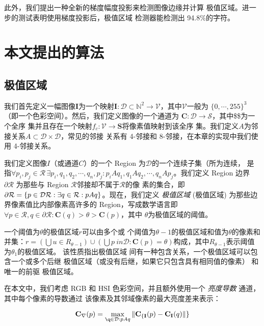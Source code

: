 \documentclass[UTF8]{ctexart}
\begin{document}
此外，我们提出一种全新的梯度幅度投影来检测图像边缘并计算 极值区域。进一步的测试表明使用梯度投影后，极值区域 检测器能检测出 94.8\%的字符。

\section{本文提出的算法}

\subsection{极值区域}

我们首先定义一幅图像$\mathbf{I}$为一个映射$\mathbf{I} : \mathcal{D} \subset
\mathbb{N}^2 \rightarrow \mathcal{V}$，其中$\mathcal{V}$一般为
$\{0,\cdots,255\}^3$（即一个色彩空间）。然后，我们定义图像的一个通道为
$\mathbf{C} : \mathcal{D} \rightarrow \mathcal{S}$，其中\$\$为一个全序
集并且存在一个映射$f_c : \mathcal{V} \rightarrow \mathbf{S}$将像素值映射到该全序
集。我们定义$A$为邻接关系$A \subset \mathcal{D} \times \mathcal{D}$，常见的邻接
关系有 4-邻接和 8-邻接，在本章的实现中我们使用 4-邻接关系。

我们定义图像$I$（或通道$C$）的一个 Region 为$\mathcal{D}$的一个连续子集（所为连续，
是指$\forall{p_i, p_j \in \mathcal{R}}\, \exists{p_i, q_1, q_2, \cdots, q_n,
  p_j} : p_iAq_1, q_1Aq_2,\cdots,q_nAp_j$。我们定义 Region 边界
$\partial{\mathcal{R}}$ 为那些与 Region $\mathcal{R}$邻接却不属于$\mathcal{R}$的像
素的集合，即$\partial{\mathcal{R}} = \{p \in \mathcal{D} \\ \mathcal{R} :
\exists{q \in \mathcal{R}} : pAq \}$。现在，我们定义 \textit{极值区域} (极值区域)
为那些边界像素值比内部像素高许多的 Region，写成数学语言即$ \forall{p \in
  \mathcal{R}}, q \in \partial{\mathcal{R}} : \mathbf{C}(q) > \theta > \mathbf{C}(p)$，其中
$\theta$为极值区域的阈值。

一个阈值为$\theta$的极值区域$r$可以由多个或
个阈值为$\theta - 1$的极值区域和值为$\theta$的像素和并集：$r = \left( \bigcup{u \in
    R_{\theta-1}} \right) \cup \left( \bigcup{p \ in \mathcal{D} : \mathbf{C}(p)
  = \theta} \right)$构成，其中$R_{\theta-1}$表示阈值为$\theta_1$的极值区域。
该性质指出极值区域 间有一种包含关系，一个极值区域可以包含一个或多个后继 极值区域（或没有后继，如果它只包含具有相同值的像素）
和唯一的前驱 极值区域。

在本文中，我们考虑 RGB 和 HSI 色彩空间，并且额外使用一个 \emph{亮度导数} 通道，其中每个像素的导数通过
该像素及其邻域像素的最大亮度差来表示：

\[
\mathbf{C}_{\nabla}(p) = \max_{\q \in \mathcal{D} : pAq}{\|\mathbf{C}_{\{\mathbf{I}}(p) - \mathbf{C}_\mathbf{I}(q) \| \}}
\]
\end{document}
